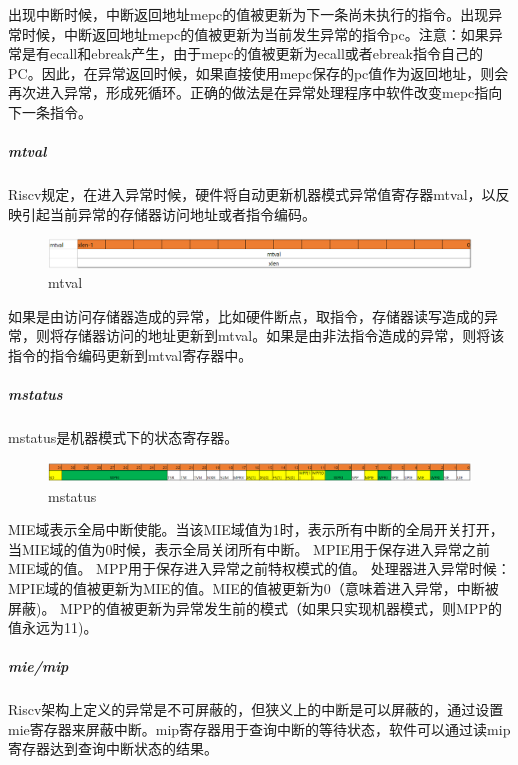 出现中断时候，中断返回地址mepc的值被更新为下一条尚未执行的指令。出现异常时候，中断返回地址mepc的值被更新为当前发生异常的指令pc。注意：如果异常是有ecall和ebreak产生，由于mepc的值被更新为ecall或者ebreak指令自己的PC。因此，在异常返回时候，如果直接使用mepc保存的pc值作为返回地址，则会再次进入异常，形成死循环。正确的做法是在异常处理程序中软件改变mepc指向下一条指令。

\subparagraph{mtval}
Riscv规定，在进入异常时候，硬件将自动更新机器模式异常值寄存器mtval，以反映引起当前异常的存储器访问地址或者指令编码。

\begin{figure}[H] %
    \centering %
    \includegraphics[width=1.0\textwidth]{figs/mtval.png} %
    \caption{mtval} %
    \label{Fig.7} %
\end{figure}

如果是由访问存储器造成的异常，比如硬件断点，取指令，存储器读写造成的异常，则将存储器访问的地址更新到mtval。如果是由非法指令造成的异常，则将该指令的指令编码更新到mtval寄存器中。

\subparagraph{mstatus}
mstatus是机器模式下的状态寄存器。

\begin{figure}[H] %
    \centering %
    \includegraphics[width=1.0\textwidth]{figs/mstatus.png} %
    \caption{mstatus} %
    \label{Fig.8} %
\end{figure}

MIE域表示全局中断使能。当该MIE域值为1时，表示所有中断的全局开关打开，当MIE域的值为0时候，表示全局关闭所有中断。
MPIE用于保存进入异常之前MIE域的值。
MPP用于保存进入异常之前特权模式的值。
处理器进入异常时候：MPIE域的值被更新为MIE的值。MIE的值被更新为0（意味着进入异常，中断被屏蔽)。
MPP的值被更新为异常发生前的模式（如果只实现机器模式，则MPP的值永远为11)。

\subparagraph{mie/mip}
Riscv架构上定义的异常是不可屏蔽的，但狭义上的中断是可以屏蔽的，通过设置mie寄存器来屏蔽中断。mip寄存器用于查询中断的等待状态，软件可以通过读mip寄存器达到查询中断状态的结果。

